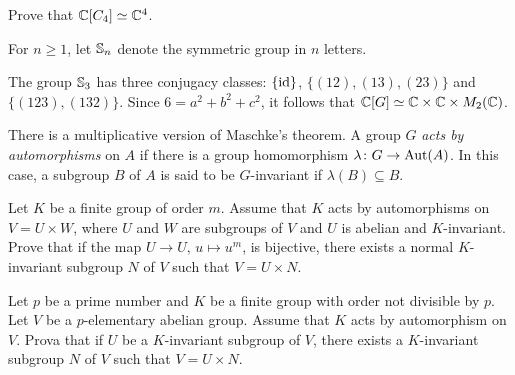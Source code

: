 \begin{exercise}
\label{xca:C4}
    Prove that $\mathbb{C}[C_4]\simeq\mathbb{C}^4$. 
\end{exercise}

For $n\geq1$, let $\mathbb{S}_n$ denote the symmetric group in $n$ letters. 

\begin{example}
    The group $\mathbb{S}_3$ has three conjugacy classes:
    $\{\operatorname{id}\}$, $\{(12),(13),(23)\}$ and $\{(123),(132)\}$. 
    Since $6=a^2+b^2+c^2$, it follows that 
    $\mathbb{C}[G]\simeq\mathbb{C}\times\mathbb{C}\times M_2(\mathbb{C})$. 
\end{example}    





There is a multiplicative version of Maschke's theorem. A group $G$ \emph{acts 
by automorphisms} on $A$ if there is a group homomorphism 
$\lambda\colon G\to\operatorname{Aut}(A)$. In this case, a subgroup $B$ of $A$ is said to be 
$G$-invariant if $\lambda(B)\subseteq B$. 

\begin{bonus}
\label{xca:Maschke_multiplicative}
    Let $K$ be a finite group of order $m$. Assume that 
    $K$ acts by automorphisms on $V=U\times W$, where
    $U$ and $W$ are subgroups of $V$ and $U$ is abelian and $K$-invariant. Prove that 
    if the map $U\to U$, $u\mapsto u^m$, is bijective, 
    there exists a normal $K$-invariant subgroup $N$ of $V$ such that $V=U\times N$. 
\end{bonus}

\begin{bonus}
    Let $p$ be a prime number and $K$ be a finite
    group with order not divisible by $p$. Let $V$ be
    a $p$-elementary abelian group. Assume that $K$ acts
    by automorphism on $V$. Prova that if $U$ be a $K$-invariant subgroup of $V$, 
    there exists a $K$-invariant subgroup $N$ of $V$ 
    such that $V=U\times N$. 
\end{bonus}


